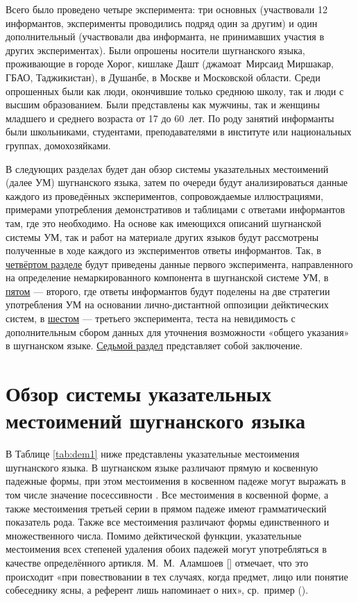 Всего было проведено четыре эксперимента: три основных (участвовали 12 информантов, эксперименты проводились подряд один за другим) и один дополнительный (участвовали два информанта, не принимавших участия в других экспериментах). Были опрошены носители шугнанского языка, проживающие в городе Хорог, кишлаке Дашт (джамоат~Мирсаид Миршакар, ГБАО, Таджикистан), в Душанбе, в Москве и Московской области. Среди опрошенных были как люди, окончившие только среднюю школу, так и люди с высшим образованием. Были представлены как мужчины, так и женщины младшего и среднего возраста от 17 до 60~лет. По роду занятий информанты были школьниками, студентами, преподавателями в институте или национальных группах, домохозяйками.

В следующих разделах будет дан обзор системы указательных местоимений (далее УМ) шугнанского языка, затем по очереди будут анализироваться данные каждого из проведённых экспериментов, сопровождаемые иллюстрациями, примерами употребления демонстративов и таблицами с ответами информантов там, где это необходимо. На основе как имеющихся описаний шугнанской системы УМ, так и работ на материале других языков будут рассмотрены полученные в ходе каждого из экспериментов ответы информантов. Так, в \hyperref[dem-exp1]{четвёртом разделе} будут приведены данные первого эксперимента, направленного на определение немаркированного компонента в шугнанской системе УМ, в \hyperref[dem-exp2]{пятом} — второго, где ответы информантов будут поделены на две стратегии употребления УМ на основании лично-дистантной оппозиции дейктических систем, в \hyperref[dem-exp3]{шестом} — третьего эксперимента, теста на невидимость с дополнительным сбором данных для уточнения возможности «общего указания» в шугнанском языке. \hyperref[dem-conclusion]{Седьмой раздел} представляет собой заключение.

\section{Обзор системы указательных местоимений шугнанского языка} \label{dem-overview}

В Таблице \ref{tab:dem1} ниже представлены указательные местоимения шугнанского языка. В шугнанском языке различают прямую и косвенную падежные формы, при этом местоимения в косвенном падеже могут выражать в том числе значение посессивности \parencite[31]{alamshoev1994}. Все местоимения в косвенной форме, а также местоимения третьей серии в прямом падеже имеют грамматический показатель рода. Также все местоимения различают формы единственного и множественного числа. Помимо дейктической функции, указательные местоимения всех степеней удаления обоих падежей могут употребляться в качестве определённого артикля. М.~М.~Аламшоев [\cite*[34]{alamshoev1994}] отмечает, что это происходит «при повествовании в тех случаях, когда предмет, лицо или понятие собеседнику ясны, а референт лишь напоминает о них», ср.~пример ().

